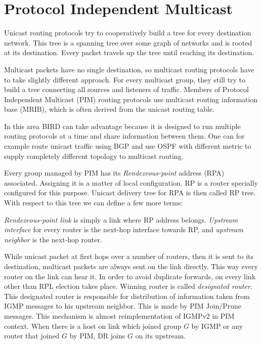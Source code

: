 \chapter{Protocol Independent Multicast}

Unicast routing protocols try to cooperatively build a tree for every
destination network. This tree is a spanning tree over some graph of networks
and is rooted at its destination. Every packet travels up the tree until
reaching its destination.

Multicast packets have no single destination, so multicast routing protocols
have to take slightly different approach. For every multicast group, they still
try to build a tree connecting all sources and listeners of traffic. Members of
Protocol Independent Multicast (PIM) routing protocols use multicast routing
information base (MRIB), which is often derived from the unicast routing table.

In this area BIRD can take advantage because it is designed to run multiple
routing protocols at a time and share information between them. One can for
example route unicast traffic using BGP and use OSPF with different metric to
supply completely different topology to multicast routing.

Every group managed by PIM has its \emph{Rendezvous-point} address (RPA)
associated. Assigning it is a matter of local configuration. RP is a router
specially configured for this purpose. Unicast delivery tree for RPA is then
called RP tree. With respect to this tree we can define a few more terms:

\emph{Rendezvous-point link} is simply a link where RP address belongs.
\emph{Upstream interface} for every router is the next-hop interface towards
RP, and \emph{upstream neighbor} is the next-hop router.

While unicast packet at first hops over a number of routers, then it is sent to
its destination, multicast packets are always sent on the link directly. This
way every router on the link can hear it. In order to avoid duplicate forwards, on
every link other than RPL election takes place. Winning router is called
\emph{designated router}. This designated router is responsible for
distribution of information taken from IGMP messages to his upstream neighbor. This
is made by PIM Join/Prune messages. This mechanism is almost reimplementation
of IGMPv2 in PIM context. When there is a host on link which joined group $G$
by IGMP or any router that joined $G$ by PIM, DR joins $G$ on its upstream.

